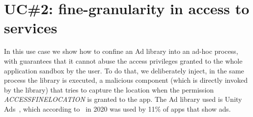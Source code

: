 \section{UC\#2: fine-granularity in access to services}\label{appendix:seapp_uc2}

In this use case we show how to confine an Ad library into an ad-hoc
process, with guarantees that it cannot abuse the access privileges
granted to the whole application sandbox by the user.  To do that, we
deliberately inject, in the same process the library is executed, a
malicious component (which is directly invoked by the library) that
tries to capture the location when the permission {\em
  ACCESS\textunderscore FINE\textunderscore LOCATION} is granted to
the app. The Ad library used is Unity Ads~\cite{seapp_unityads}, which
according to~\cite{seapp_ads_use} in 2020 was used by 11\% of apps
that show ads.
%

